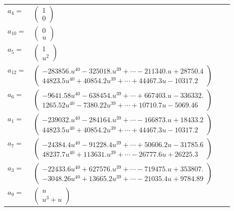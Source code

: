 \documentclass[1p]{elsarticle_modified}
\theoremstyle{definition}
\begin{document}
\begin{tabular}{m{7pt} m{180pt} m{7pt} m{180pt} }
\flushright $a_{4}=$&$\begin{pmatrix}1\\0\end{pmatrix}$ \\
\flushright $a_{10}=$&$\begin{pmatrix}0\\u\end{pmatrix}$ \\
\flushright $a_{5}=$&$\begin{pmatrix}1\\u^2\end{pmatrix}$ \\
\flushright $a_{12}=$&$\begin{pmatrix}-283856. u^{40}-325018. u^{39}+\cdots-211340. u+28750.4\\44823.5 u^{40}+40854.2 u^{39}+\cdots+44467.3 u-10317.2\end{pmatrix}$ \\
\flushright $a_{6}=$&$\begin{pmatrix}-9641.58 u^{40}-638454. u^{39}+\cdots+667403. u-336332.\\1265.52 u^{40}-7380.22 u^{39}+\cdots+10710.7 u-5069.46\end{pmatrix}$ \\
\flushright $a_{1}=$&$\begin{pmatrix}-239032. u^{40}-284164. u^{39}+\cdots-166873. u+18433.2\\44823.5 u^{40}+40854.2 u^{39}+\cdots+44467.3 u-10317.2\end{pmatrix}$ \\
\flushright $a_{7}=$&$\begin{pmatrix}-24384.4 u^{40}-91228.4 u^{39}+\cdots+50606.2 u-31785.6\\48237.7 u^{40}+113631. u^{39}+\cdots-26777.6 u+26225.3\end{pmatrix}$ \\
\flushright $a_{3}=$&$\begin{pmatrix}-22433.6 u^{40}+627576. u^{39}+\cdots-719475. u+353807.\\-3048.26 u^{40}+13665.2 u^{39}+\cdots-21035.4 u+9784.89\end{pmatrix}$ \\
\flushright $a_{9}=$&$\begin{pmatrix}u\\u^3+u\end{pmatrix}$ \\

\end{tabular}
\end{document}
